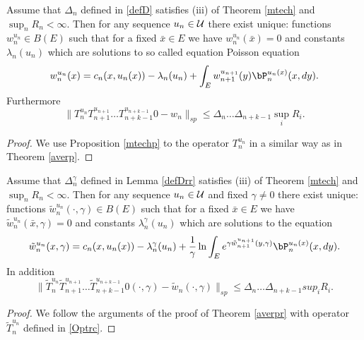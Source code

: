 \documentclass[10pt,english]{extarticle}
\begin{document}
\begin{proposition}\label{averpc}
Assume that $\Delta_n$ defined in \eqref{defD} satisfies (iii) of Theorem \ref{mtech} and $\sup_n R_n<\infty$. Then for any sequence $u_n\in {\cal U}$ there exist unique: functions  $w_n^{u_n}\in B(E)$ such that for a fixed $\bar{x}\in E$ we have  $w_n^{u_n}(\bar{x})=0$ and constants $\lambda_n(u_n)$ which are solutions to so called equation Poisson equation
\begin{equation}\label{Pois1}
w_n^{u_n}(x)= c_n(x,u_n(x))-\lambda_n(u_n)+\int_E w_{n+1}^{u_{n+1}}(y)\bP_n^{u_n(x)}(x,dy).
\end{equation}
Furthermore
\begin{equation}\label{impinec}
\|T_n^{u_n}T_{n+1}^{u_{n+1}}\ldots T_{n+k-1}^{u_{n+k-1}}0-w_n\|_{sp}\leq  \Delta_n\ldots \Delta_{n+k-1}\sup_i R_i.
\end{equation}
\end{proposition}
\begin{proof} We use Proposition \ref{mtechp} to the operator $T_n^{u_n}$ in a similar way as in
Theorem \ref{averp}.
\end{proof}

\begin{proposition}\label{averprc}
Assume that $\Delta_n^\gamma$ defined in Lemma \ref{defDrr} satisfies (iii) of Theorem \ref{mtech} and $\sup_n R_n<\infty$. Then for any sequence $u_n\in {\cal U}$ and fixed $\gamma\neq 0$  there exist unique: functions  $\tilde{w}_n^{u_n}(\cdot,\gamma)\in B(E)$ such that for a fixed $\bar{x}\in E$ we have  $\tilde{w}_n^{u_n}(\bar{x},\gamma)=0$ and constants $\lambda_n^\gamma(u_n)$ which are solutions to the equation
\begin{equation}\label{Pois2}
\tilde{w}_n^{u_n}(x,\gamma)=c_n(x,u_n(x))-\lambda_n^\gamma(u_n)+ {1\over \gamma}\ln\int_E e^{\gamma \tilde{w}_{n+1}^{u_{n+1}}(y,\gamma)}\bP_n^{u_n(x)}(x,dy).
\end{equation}
In addition
\begin{equation}\label{impinecc}
\|\tilde{T}_n^{u_n}\tilde{T}_{n+1}^{u_{n+1}}\ldots \tilde{T}_{n+k-1}^{u_{n+k-1}}0(\cdot,\gamma)-\tilde{w}_n(\cdot,\gamma)\|_{sp}\leq \Delta_n\ldots \Delta_{n+k-1}sup_i R_i.
\end{equation}
\end{proposition}
\begin{proof} We follow the arguments of the proof of Theorem \ref{averpr} with operator $\tilde{T}_n^{u_n}$ defined in \eqref{Optrc}.
\end{proof}
\end{document}
